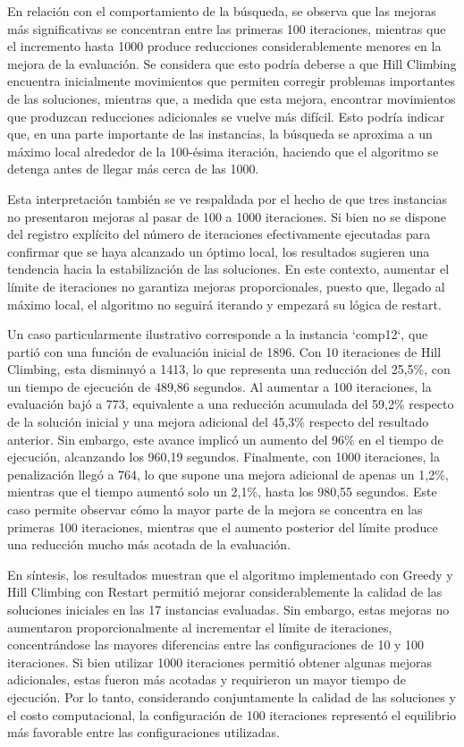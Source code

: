 \documentclass[letter, 10pt]{article}
\begin{document}
En relaci\'on con el comportamiento de la b\'usqueda, se observa que las mejoras m\'as significativas se concentran entre las primeras 100 iteraciones, mientras que el incremento hasta 1000 produce reducciones considerablemente menores en la mejora de la evaluaci\'on. Se considera que esto podr\'ia deberse a que Hill Climbing encuentra inicialmente movimientos que permiten corregir problemas importantes de las soluciones, mientras que, a medida que esta mejora, encontrar movimientos que produzcan reducciones adicionales se vuelve m\'as dif\'icil. Esto podr\'ia indicar que, en una parte importante de las instancias, la b\'usqueda se aproxima a un m\'aximo local alrededor de la 100-\'esima iteraci\'on, haciendo que el algoritmo se detenga antes de llegar m\'as cerca de las 1000.

Esta interpretaci\'on tambi\'en se ve respaldada por el hecho de que tres instancias no presentaron mejoras al pasar de 100 a 1000 iteraciones. Si bien no se dispone del registro expl\'icito del n\'umero de iteraciones efectivamente ejecutadas para confirmar que se haya alcanzado un \'optimo local, los resultados sugieren una tendencia hacia la estabilizaci\'on de las soluciones. En este contexto, aumentar el l\'imite de iteraciones no garantiza mejoras proporcionales, puesto que, llegado al m\'aximo local, el algoritmo no seguir\'a iterando y empezar\'a su l\'ogica de restart.

Un caso particularmente ilustrativo corresponde a la instancia `comp12`, que parti\'o con una funci\'on de evaluaci\'on inicial de 1896. Con 10 iteraciones de Hill Climbing, esta disminuy\'o a 1413, lo que representa una reducci\'on del 25,5\%, con un tiempo de ejecuci\'on de 489,86 segundos. Al aumentar a 100 iteraciones, la evaluaci\'on baj\'o a 773, equivalente a una reducci\'on acumulada del 59,2\% respecto de la soluci\'on inicial y una mejora adicional del 45,3\% respecto del resultado anterior. Sin embargo, este avance implic\'o un aumento del 96\% en el tiempo de ejecuci\'on, alcanzando los 960,19 segundos. Finalmente, con 1000 iteraciones, la penalizaci\'on lleg\'o a 764, lo que supone una mejora adicional de apenas un 1,2\%, mientras que el tiempo aument\'o solo un 2,1\%, hasta los 980,55 segundos. Este caso permite observar c\'omo la mayor parte de la mejora se concentra en las primeras 100 iteraciones, mientras que el aumento posterior del l\'imite produce una reducci\'on mucho m\'as acotada de la evaluaci\'on.

En s\'intesis, los resultados muestran que el algoritmo implementado con Greedy y Hill Climbing con Restart permiti\'o mejorar considerablemente la calidad de las soluciones iniciales en las 17 instancias evaluadas. Sin embargo, estas mejoras no aumentaron proporcionalmente al incrementar el l\'imite de iteraciones, concentr\'andose las mayores diferencias entre las configuraciones de 10 y 100 iteraciones. Si bien utilizar 1000 iteraciones permiti\'o obtener algunas mejoras adicionales, estas fueron m\'as acotadas y requirieron un mayor tiempo de ejecuci\'on. Por lo tanto, considerando conjuntamente la calidad de las soluciones y el costo computacional, la configuraci\'on de 100 iteraciones represent\'o el equilibrio m\'as favorable entre las configuraciones utilizadas.
\end{document}
